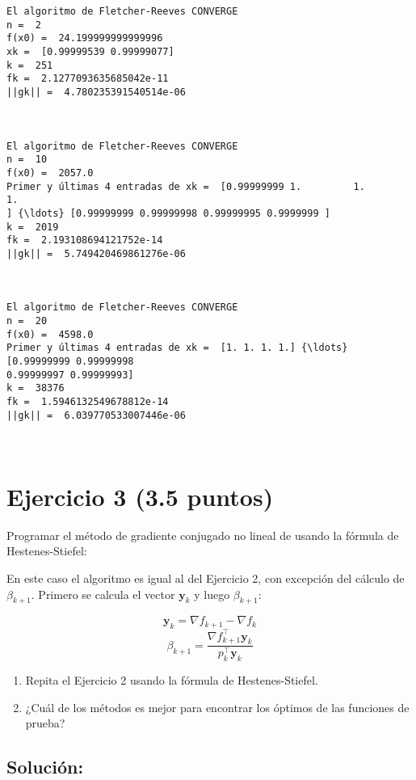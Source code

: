 \documentclass[11pt]{article}
\providecommand{\tightlist}{%
      \setlength{\itemsep}{0pt}\setlength{\parskip}{0pt}}
\begin{document}
    \begin{Verbatim}[commandchars=\\\{\}]
El algoritmo de Fletcher-Reeves CONVERGE
n =  2
f(x0) =  24.199999999999996
xk =  [0.99999539 0.99999077]
k =  251
fk =  2.1277093635685042e-11
||gk|| =  4.780235391540514e-06



El algoritmo de Fletcher-Reeves CONVERGE
n =  10
f(x0) =  2057.0
Primer y últimas 4 entradas de xk =  [0.99999999 1.         1.         1.
] {\ldots} [0.99999999 0.99999998 0.99999995 0.9999999 ]
k =  2019
fk =  2.193108694121752e-14
||gk|| =  5.749420469861276e-06



El algoritmo de Fletcher-Reeves CONVERGE
n =  20
f(x0) =  4598.0
Primer y últimas 4 entradas de xk =  [1. 1. 1. 1.] {\ldots} [0.99999999 0.99999998
0.99999997 0.99999993]
k =  38376
fk =  1.5946132549678812e-14
||gk|| =  6.039770533007446e-06



    \end{Verbatim}

    \hypertarget{ejercicio-3-3.5-puntos}{%
\section{Ejercicio 3 (3.5 puntos)}\label{ejercicio-3-3.5-puntos}}

Programar el método de gradiente conjugado no lineal de usando la
fórmula de Hestenes-Stiefel:

En este caso el algoritmo es igual al del Ejercicio 2, con excepción del
cálculo de \(\beta_{k+1}\). Primero se calcula el vector
\(\mathbf{y}_k\) y luego \(\beta_{k+1}\):

\[ \mathbf{y}_k =  \nabla f_{k+1}-\nabla f_{k} \]
\[ \beta_{k+1} =   \frac{\nabla f_{k+1}^\top\mathbf{y}_k }{p_{k}^\top\mathbf{y}_k}  \]

\begin{enumerate}
\def\labelenumi{\arabic{enumi}.}
\tightlist
\item
  Repita el Ejercicio 2 usando la fórmula de Hestenes-Stiefel.
\item
  ¿Cuál de los métodos es mejor para encontrar los óptimos de las
  funciones de prueba?
\end{enumerate}

\hypertarget{soluciuxf3n}{%
\subsection{Solución:}\label{soluciuxf3n}}
\end{document}
